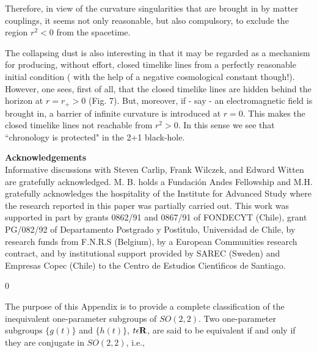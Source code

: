 Therefore, in view of the curvature singularities that are
brought in by matter couplings, it seems not only reasonable,
but also compulsory, to exclude the region $r^{2} < 0$ from the
spacetime.

  The collapsing dust is also interesting in that it may be regarded as a
mechanism for producing, without effort, closed timelike lines from a
perfectly
reasonable initial condition ( with the help of a negative cosmological
constant though!). However, one sees, first of all, that the closed timelike
lines are hidden behind the horizon at $r=r_+ >0$ (Fig. 7). But,
moreover, if - say - an electromagnetic field is brought in, a barrier of
 infinite
curvature is introduced at $r=0$. This makes the closed timelike lines not
reachable from $r^2 > 0$.  In this sense we see that
``chronology is protected" \cite{13} in the 2+1 black-hole.

\newpage
{\bf Acknowledgements}\\

Informative discussions with Steven Carlip, Frank Wilczek,
and Edward Witten are gratefully acknowledged. M. B. holds
a Fundaci\'on Andes Fellowship and M.H. gratefully
acknowledges the hospitality of the Institute for Advanced
Study where the research reported in this paper was
partially carried out.  This work was supported in part by
grants 0862/91 and 0867/91 of FONDECYT (Chile), grant PG/082/92
of Departamento Postgrado y Post\'{\i}tulo, Universidad de Chile,
by research funds from F.N.R.S (Belgium), by a European Communities research
contract, and by
institutional support provided by SAREC (Sweden) and
Empresas Copec (Chile) to the Centro de Estudios
Cient\'{\i}ficos de Santiago.







\newpage
{}


\renewcommand{\theequation}{A.\arabic{equation}}
\setcounter{equation} 0
%

The purpose of this Appendix is to provide a complete
classification of the inequivalent one-parameter subgroups of
$SO(2,2)$. Two one-parameter subgroups $\{g(t)\}$ and
$\{h(t)\}$,  $t\epsilon {\bf R}$, are said to be equivalent if
and only if they are conjugate in $SO(2,2)$, i.e.,


